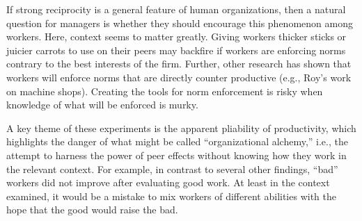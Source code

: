 \documentclass[12pt]{article}
\begin{document}
If strong reciprocity is a general feature of human organizations,
then a natural question for managers is whether they should encourage
this phenomenon among workers. Here, context seems to matter
greatly. Giving workers thicker sticks or juicier carrots to use on
their peers may backfire if workers are enforcing norms contrary to
the best interests of the firm. Further, other research has shown that
workers will enforce norms that are directly counter productive (e.g.,
Roy's \citeyear{roy1952quota} work on machine shops). Creating the
tools for norm enforcement is risky when knowledge of what will be
enforced is murky.

A key theme of these experiments is the apparent pliability of
productivity, which highlights the danger of what might be called
``organizational alchemy,'' i.e., the attempt to harness the power of
peer effects without knowing how they work in the relevant
context. For example, in contrast to several other findings, ``bad''
workers did not improve after evaluating good work.  At least in the
context examined, it would be a mistake to mix workers of different
abilities with the hope that the good would raise the bad.



\end{document}
